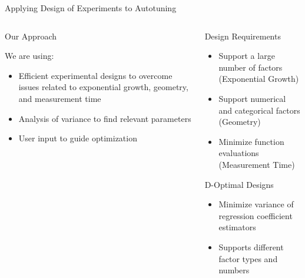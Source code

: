 \documentclass[10pt, compress, aspectratio=169, xcolor={table,usenames,dvipsnames}]{beamer}
\begin{document}
\begin{frame}[label={sec:org9fb7f76}]{Applying Design of Experiments to Autotuning}
\begin{columns}
\begin{column}{0.5\columnwidth}
\begin{block}{Our Approach}
\vspace{.2cm}

We are using:

\begin{itemize}
\item \alert{Efficient experimental designs} to overcome issues related to \alert{exponential growth}, \alert{geometry}, and \alert{measurement time}
\item \alert{Analysis of variance} to find \alert{relevant parameters}
\item \alert{User input} to guide optimization
\end{itemize}

\vspace{2cm}
\end{block}
\end{column}

\begin{column}{0.5\columnwidth}
\begin{block}{Design Requirements}
\begin{itemize}
\item Support a large number of factors (\alert{Exponential Growth})
\item Support numerical and categorical factors (\alert{Geometry})
\item Minimize function evaluations (\alert{Measurement Time})
\end{itemize}

\begin{block}{D-Optimal Designs}
\begin{itemize}
\item Minimize \alert{variance} of \alert{regression coefficient estimators}
\item Supports different factor \alert{types} and \alert{numbers}
\end{itemize}
\end{block}
\end{block}
\end{column}
\end{columns}
\end{frame}
\end{document}
